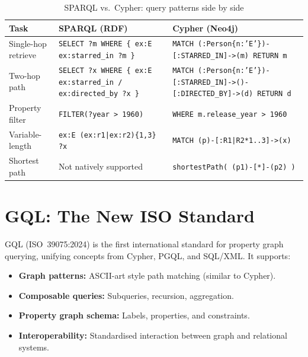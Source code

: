 \documentclass[11pt,a4paper,oneside,openany]{book}
\theoremstyle{definition}
\theoremstyle{plain}
\theoremstyle{remark}
\begin{document}
\begin{table}[h]
	\centering
	\caption{SPARQL vs.\ Cypher: query patterns side by side}
	\label{tab:sparql-cypher}
	\begin{tabular}{lp{6cm}p{6cm}}
		\toprule
		Task                & SPARQL (RDF)                                                            & Cypher (Neo4j)                                                                     \\
		\midrule
		Single-hop retrieve & \texttt{SELECT ?m WHERE \{ ex:E ex:starred\_in ?m \}}                   & \texttt{MATCH (:Person\{n:'E'\})-[:STARRED\_IN]->(m) RETURN m}                     \\
		Two-hop path        & \texttt{SELECT ?x WHERE \{ ex:E ex:starred\_in / ex:directed\_by ?x \}} & \texttt{MATCH (:Person\{n:'E'\})-[:STARRED\_IN]->()-[:DIRECTED\_BY]->(d) RETURN d} \\
		Property filter     & \texttt{FILTER(?year > 1960)}                                           & \texttt{WHERE m.release\_year > 1960}                                              \\
		Variable-length     & \texttt{ex:E (ex:r1|ex:r2)\{1,3\} ?x}                                   & \texttt{MATCH (p)-[:R1|R2*1..3]->(x)}                                              \\
		Shortest path       & Not natively supported                                                  & \texttt{shortestPath( (p1)-[*]-(p2) )}                                             \\
		\bottomrule
	\end{tabular}
\end{table}

\section{GQL: The New ISO Standard}\label{sec:gql}

GQL (ISO~39075:2024) is the first international standard for property graph querying, unifying concepts from Cypher, PGQL, and SQL/XML. It supports:

\begin{itemize}
	\item \textbf{Graph patterns:} ASCII-art style path matching (similar to Cypher).
	\item \textbf{Composable queries:} Subqueries, recursion, aggregation.
	\item \textbf{Property graph schema:} Labels, properties, and constraints.
	\item \textbf{Interoperability:} Standardised interaction between graph and relational systems.
\end{itemize}
\end{document}
